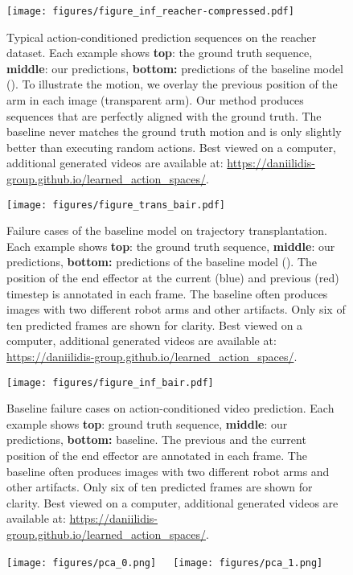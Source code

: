 \documentclass{article} %
\begin{document}
\begin{figure}
  \texttt{[image: figures/figure\_inf\_reacher-compressed.pdf]}
\vspace{-7pt}
  \caption{Typical action-conditioned prediction sequences on the reacher dataset. Each example shows \textbf{top}: the ground truth sequence,  \textbf{middle}: our predictions, \textbf{bottom:} predictions of the baseline model (\cite{denton18stochastic}). To illustrate the motion, we overlay the previous position of the arm in each image (transparent arm). Our method produces sequences that are perfectly aligned with the ground truth. The baseline never matches the ground truth motion and is only slightly better than executing random actions. Best viewed on a computer, additional generated videos are available at: \url{https://daniilidis-group.github.io/learned_action_spaces/}.}
  \label{fig:inf_reacher}
   \vspace{-10pt}
\end{figure}\begin{figure}
  \centering
  \texttt{[image: figures/figure\_trans\_bair.pdf]} \\[0.05cm]
\vspace{-7pt}
  \caption{Failure cases of the baseline model on trajectory transplantation.  Each example shows \textbf{top}: the ground truth sequence,  \textbf{middle}: our predictions, \textbf{bottom:} predictions of the baseline model (\cite{denton18stochastic}). The position of the end effector at the current (blue) and previous (red) timestep is annotated in each frame. The baseline often produces images with two different robot arms and other artifacts. Only six of ten predicted frames are shown for clarity. Best viewed on a computer, additional generated videos are available at: \url{https://daniilidis-group.github.io/learned_action_spaces/}.}
  \label{fig:trans_bair}
   \vspace{-10pt}
\end{figure}\begin{figure}
  \centering
  \texttt{[image: figures/figure\_inf\_bair.pdf]} \\[0.05cm]
\vspace{-7pt}
  \caption{Baseline failure cases on action-conditioned video prediction.  Each example shows \textbf{top}: ground truth sequence,  \textbf{middle}: our predictions, \textbf{bottom:} \cite{denton18stochastic} baseline. The previous and the current position of the end effector are annotated in each frame. The baseline often produces images with two different robot arms and other artifacts. Only six of ten predicted frames are shown for clarity. Best viewed on a computer, additional generated videos are available at: \url{https://daniilidis-group.github.io/learned_action_spaces/}.}
  \label{fig:inf_bair}
   \vspace{-10pt}
\end{figure}\begin{figure}
  \centering
  \texttt{[image: figures/pca\_0.png]}~~~\texttt{[image: figures/pca\_1.png]}
  

\end{figure}
\end{document}

